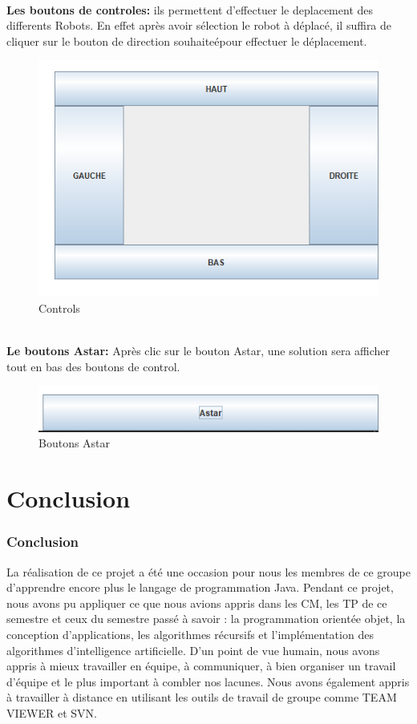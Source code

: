 \documentclass{beamer}
\begin{document}
	\begin{frame}
		\\\textbf{ Les boutons de controles:} ils permettent d'effectuer le deplacement des differents Robots. En effet après avoir sélection le robot à déplacé, il suffira de cliquer sur le bouton de direction souhaiteépour effectuer le déplacement.
		\begin{figure}[htpb]
			\includegraphics[scale=0.2]{./images/btnControl.png}
			\caption{Controls \label{figure1} }
		\end{figure}
		\\\textbf{ Le boutons Astar:} Après clic sur le bouton Astar, une solution sera afficher tout en  bas des boutons de control.
		
		\begin{figure}[htpb]
			\includegraphics[scale=0.2]{./images/btnAstar.png}
			\caption{Boutons Astar \label{figure1} }
		\end{figure}
		
		
	\end{frame}
	\section{Conclusion}
	
	
\begin{frame}
\frametitle{Conclusion}

	La réalisation de ce projet a été une occasion pour nous les membres de ce groupe d’apprendre encore plus le langage de programmation Java.
	Pendant ce projet, nous avons pu appliquer ce que nous avions appris dans les CM, les TP de ce semestre et ceux du semestre passé à savoir : la programmation orientée objet, la conception d’applications, les algorithmes récursifs et l’implémentation des algorithmes d’intelligence artificielle. 
	D'un point de vue humain, nous avons appris à mieux travailler en équipe, à communiquer, à bien organiser un travail d’équipe et le plus important à combler nos lacunes.  
	Nous avons également appris à travailler à distance en utilisant les outils de travail de groupe comme TEAM VIEWER et SVN.
\end{frame}
	
\end{document}
